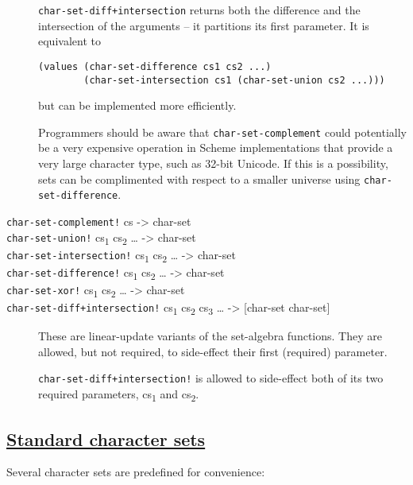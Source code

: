 \begin{description}
\texttt{char-set-diff+intersection} returns both the difference and the
intersection of the arguments -- it partitions its first parameter. It
is equivalent to

\begin{verbatim}
(values (char-set-difference cs1 cs2 ...)
        (char-set-intersection cs1 (char-set-union cs2 ...)))
\end{verbatim}

but can be implemented more efficiently.

Programmers should be aware that \texttt{char-set-complement} could
potentially be a very expensive operation in Scheme implementations that
provide a very large character type, such as 32-bit Unicode. If this is
a possibility, sets can be complimented with respect to a smaller
universe using \texttt{char-set-difference}.
\item[ \href{}{} \href{}{} \href{}{} \href{}{} \href{}{} \href{}{}
\texttt{char-set-complement!} cs -\textgreater{} char-set\\
\texttt{char-set-union!} cs\textsubscript{1} cs\textsubscript{2}
\ldots{} -\textgreater{} char-set\\
\texttt{char-set-intersection!} cs\textsubscript{1} cs\textsubscript{2}
\ldots{} -\textgreater{} char-set\\
\texttt{char-set-difference!} cs\textsubscript{1} cs\textsubscript{2}
\ldots{} -\textgreater{} char-set\\
\texttt{char-set-xor!} cs\textsubscript{1} cs\textsubscript{2} \ldots{}
-\textgreater{} char-set\\
\texttt{char-set-diff+intersection!} cs\textsubscript{1}
cs\textsubscript{2} cs\textsubscript{3} \ldots{} -\textgreater{}
{[}char-set char-set{]} ]
These are linear-update variants of the set-algebra functions. They are
allowed, but not required, to side-effect their first (required)
parameter.

\texttt{char-set-diff+intersection!} is allowed to side-effect both of
its two required parameters, cs\textsubscript{1} and
cs\textsubscript{2}.
\end{description}

\subsection{\texorpdfstring{\href{}{Standard character
sets}}{Standard character sets}}\label{standard-character-sets}

Several character sets are predefined for convenience: \href{}{}
\href{}{} \href{}{} \href{}{} \href{}{} \href{}{} \href{}{} \href{}{}
\href{}{} \href{}{} \href{}{} \href{}{} \href{}{} \href{}{} \href{}{}
\href{}{} \href{}{} \href{}{}

